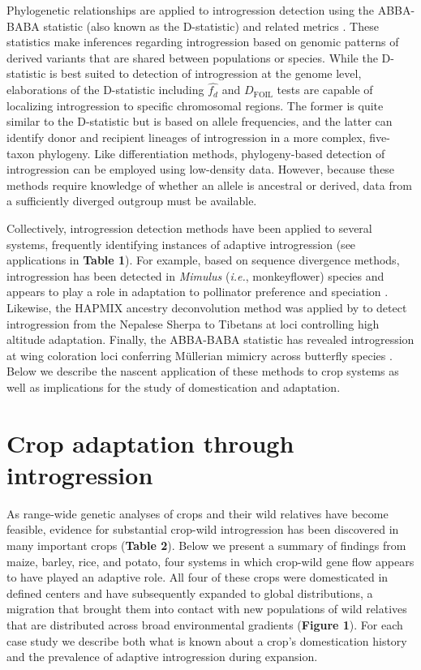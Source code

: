 \documentclass[11pt]{article}
\begin{document}
Phylogenetic relationships are applied to introgression detection using the ABBA-BABA statistic (also known as the D-statistic) and related metrics \citep{durand2011}.
These statistics make inferences regarding introgression based on genomic patterns of derived variants that are shared between populations or species.
While the D-statistic is best suited to detection of introgression at the genome level, elaborations of the D-statistic including $\hat{f_{d}}$ \citep{martin2015} and $D_{\textrm{FOIL}}$ tests \citep{pease2015} are capable of localizing introgression to specific chromosomal regions. 
The former is quite similar to the D-statistic but is based on allele frequencies, and the latter can identify donor and recipient lineages of introgression in a more complex, five-taxon phylogeny.
Like differentiation methods, phylogeny-based detection of introgression can be employed using low-density data.
However, because these methods require knowledge of whether an allele is ancestral or derived, data from a sufficiently diverged outgroup must be available.

Collectively, introgression detection methods have been applied to several systems, frequently identifying instances of adaptive introgression (see applications in \textbf{Table 1}).
For example, based on sequence divergence methods, introgression has been detected in \emph{Mimulus} (\emph{i.e.}, monkeyflower) species and appears to play a role in adaptation to pollinator preference and speciation \citep{Stankowski2015}.
Likewise, the HAPMIX ancestry deconvolution method was applied by \citet{jeong2014} to detect introgression from the Nepalese Sherpa to Tibetans at loci controlling high altitude adaptation.
Finally, the ABBA-BABA statistic has revealed introgression at wing coloration loci conferring M\"{u}llerian mimicry across butterfly species \citep{heliconius2012}.
Below we describe the nascent application of these methods to crop systems as well as implications for the study of domestication and adaptation.

\section*{Crop adaptation through introgression}

As range-wide genetic analyses of crops and their wild relatives have become feasible, evidence for substantial crop-wild introgression has been discovered in many important crops (\textbf{Table 2}).
Below we present a summary of findings from maize, barley, rice, and potato, four systems in which crop-wild gene flow appears to have played an adaptive role.
All four of these crops were domesticated in defined centers and have subsequently expanded to global distributions, a migration that brought them into contact with new populations of wild relatives that are distributed across broad environmental gradients (\textbf{Figure 1}).
For each case study we describe both what is known about a crop's domestication history and the prevalence of adaptive introgression during expansion.
\end{document}
